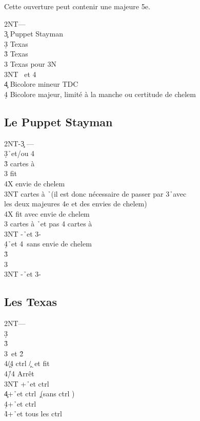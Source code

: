 \documentclass[a4paper]{article}
\begin{document}
Cette ouverture peut contenir une majeure 5e.

\begin{bidtable}
2NT---\\
3\c \> Puppet Stayman\\
3\d \> Texas \h \\
3\h \> Texas \s \\
3\s \> Texas pour 3N\\
3NT \s\ et 4\h \\
4\c \> Bicolore mineur TDC\\
4\d \> Bicolore majeur, limité à la manche ou certitude de chelem
\end{bidtable}

\subsection{Le Puppet Stayman}

\begin{bidtable}
2NT-3\c \> ---\\
3\d {}\h\ et/ou 4\s \+\\
3\h {} cartes à \s \+\\
3\s \> fit \s \+\\
4X \> envie de chelem\-\\
3NT  cartes à \h\ (il est donc nécessaire de passer par 3\h\ avec\\
\>les deux majeures 4e et des envies de chelem)\\
\>4X fit avec envie de chelem\-\\
3\s {} cartes à \h\ et pas 4 cartes à \s \\
3NT -\h\ et 3-\s \\
4\d {}\h\ et 4\s\ sans envie de chelem\-\\
3\h {}\h \\
3\s {}\s \\
3NT -\h\ et 3-\s 
\end{bidtable}

\subsection{Les Texas}

\begin{bidtable}
2NT---\\
3\d\+\\
3\h {}\h \\
3\s {}\s\ et 2\h \+\\
4\c/4\d \> ctrl \c /\d\ et fit \s \\
4\h/4\s \> Arrêt\-\\
3NT +\h\ et ctrl \s \\
4\c {}+\h\ et ctrl \c\ (sans ctrl \s )\\
4\d {}+\h\ et ctrl \d \\
4\h {}+\h\ et tous les ctrl\-
\end{bidtable}
\end{document}
